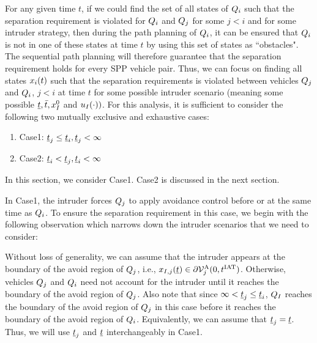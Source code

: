 For any given time $t$, if we could find the set of all states of $Q_i$ such that the separation requirement is violated for $Q_i$ and $Q_j$ for some $j<i$ and for some intruder strategy, then during the path planning of $Q_i$, it can be ensured that $Q_i$ is not in one of these states at time $t$ by using this set of states as ``obstacles". The sequential path planning will therefore guarantee that the separation requirement holds for every SPP vehicle pair. Thus, we can focus on finding all states $x_i(t)$ such that the separation requirements is violated between vehicles $Q_j$ and $Q_i$, $j <i$ at time $t$ for some possible intruder scenario (meaning some possible $\underline{t}, \bar{t}, x_{I}^0$ and $u_{I}(\cdot))$. For this analysis, it is sufficient to consider the following two mutually exclusive and exhaustive cases: 
\begin{enumerate}
\item Case1: $\underline{t}_j \leq \underline{t}_i, \underline{t}_j < \infty$
\item Case2: $\underline{t}_i < \underline{t}_j, \underline{t}_i <\infty$
\end{enumerate}
In this section, we consider Case1. Case2 is discussed in the next section.  

In Case1, the intruder forces $Q_j$ to apply avoidance control before or at the same time as $Q_i$. %
To ensure the separation requirement in this case, we begin with the following observation which narrows down the intruder scenarios that we need to consider:
\begin{observation} \label{obs1_case1}
Without loss of generality, we can assume that the intruder appears at the boundary of the avoid region of $Q_j$, i.e., $x_{I, j}(\underline{t}) \in \partial \mathcal{V}^{\text{A}}_{j}(0, t^\text{IAT})$. Otherwise, vehicles $Q_j$ and $Q_i$ need not account for the intruder until it reaches the boundary of the avoid region of $Q_j$. Also note that since $\infty < \underline{t}_j \leq \underline{t}_i$, $Q_{I}$ reaches the boundary of the avoid region of $Q_j$ in this case before it reaches the boundary of the avoid region of $Q_i$. Equivalently, we can assume that $\underline{t}_j = \underline{t}$. Thus, we will use $\underline{t}_j$ and $\underline{t}$ interchangeably in Case1.
\end{observation}